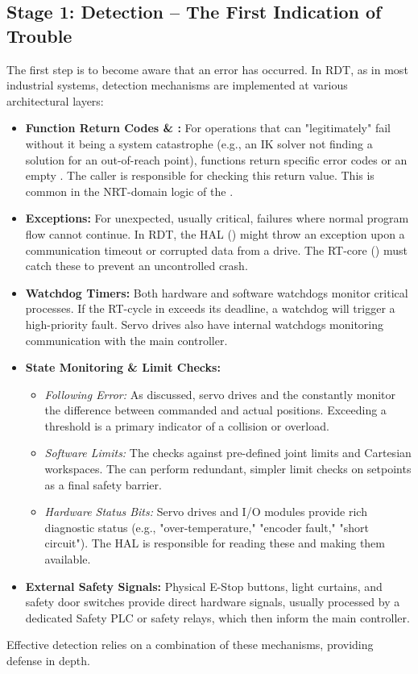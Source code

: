 \subsection{Stage 1: Detection – The First Indication of Trouble}
\label{subsec:detection_stage}
The first step is to become aware that an error has occurred. In RDT, as in most industrial systems, detection mechanisms are implemented at various architectural layers:
\begin{itemize}
    \item \textbf{Function Return Codes \& :} For operations that can "legitimately" fail without it being a system catastrophe (e.g., an IK solver not finding a solution for an out-of-reach point), functions return specific error codes or an empty . The caller is responsible for checking this return value. This is common in the NRT-domain logic of the .
    \item \textbf{Exceptions:} For unexpected, usually critical, failures where normal program flow cannot continue. In RDT, the HAL () might throw an exception upon a communication timeout or corrupted data from a drive. The RT-core () must catch these to prevent an uncontrolled crash.
    \item \textbf{Watchdog Timers:} Both hardware and software watchdogs monitor critical processes. If the RT-cycle in  exceeds its deadline, a watchdog will trigger a high-priority fault. Servo drives also have internal watchdogs monitoring communication with the main controller.
    \item \textbf{State Monitoring \& Limit Checks:}
        \begin{itemize}
            \item \textit{Following Error:} As discussed, servo drives and the  constantly monitor the difference between commanded and actual positions. Exceeding a threshold is a primary indicator of a collision or overload.
            \item \textit{Software Limits:} The  checks against pre-defined joint limits and Cartesian workspaces. The  can perform redundant, simpler limit checks on setpoints as a final safety barrier.
            \item \textit{Hardware Status Bits:} Servo drives and I/O modules provide rich diagnostic status (e.g., "over-temperature," "encoder fault," "short circuit"). The HAL is responsible for reading these and making them available.
        \end{itemize}
    \item \textbf{External Safety Signals:} Physical E-Stop buttons, light curtains, and safety door switches provide direct hardware signals, usually processed by a dedicated Safety PLC or safety relays, which then inform the main controller.
\end{itemize}
Effective detection relies on a combination of these mechanisms, providing defense in depth.

